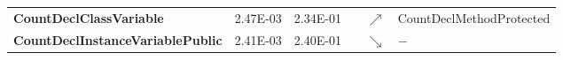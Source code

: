 \begin{sidewaystable}
\begin{tabularx}{\columnwidth}{>{\bfseries}lrrlcl}
CountDeclClassVariable                     &  2.47E-03 & 2.34E-01 &     & $\nearrow$ & CountDeclMethodProtected                                                                                                                                                                                                                                                                                                                                        \\



CountDeclInstanceVariablePublic            & 2.41E-03 & 2.40E-01 &     & $\searrow$ &  $-$                                                                                                                                                                                                                                                                                                                                                                \\


\end{tabularx}
\end{sidewaystable}
